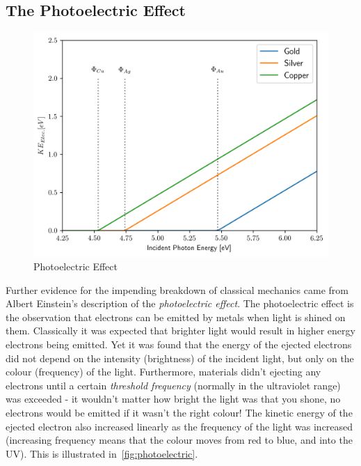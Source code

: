 \documentclass{memoir}[11pt,oneside,a4paper,openany]
\begin{document}
\subsection{The Photoelectric Effect}
\begin{figure}
	\includegraphics[width=\linewidth]{photoelectric.png}
	\caption{Photoelectric Effect}\label{fig:photoelectric}
\end{figure}
Further evidence for the impending breakdown of classical mechanics came from Albert Einstein's description of the \emph{photoelectric effect}. The photoelectric effect is the observation that electrons can be emitted by metals when light is shined on them. Classically it was expected that brighter light would result in higher energy electrons being emitted. Yet it was found that the energy of the ejected electrons did not depend on the intensity (brightness) of the incident light, but only on the colour (frequency) of the light. Furthermore, materials didn't ejecting any electrons until a certain \emph{threshold frequency} (normally in the ultraviolet range) was exceeded - it wouldn't matter how bright the light was that you shone, no electrons would be emitted if it wasn't the right colour! The kinetic energy of the ejected electron also increased linearly as the frequency of the light was increased (increasing frequency means that the colour moves from red to blue, and into the UV). This is illustrated in~\autoref{fig:photoelectric}.
\end{document}
